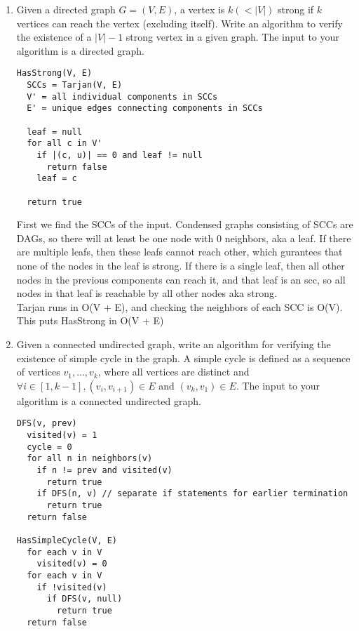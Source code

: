 \documentclass[11pt]{article}
\begin{document}
\begin{enumerate}
\newpage

\item 
Given a directed graph $G = (V, E)$, a vertex is $k ( < |V|)$ strong
if $k$ vertices can reach the vertex (excluding itself). Write an
algorithm to verify the existence of a $|V|-1$ strong vertex in a
given graph. The input to your algorithm is a directed graph.

\begin{verbatim}
HasStrong(V, E)
  SCCs = Tarjan(V, E)
  V' = all individual components in SCCs
  E' = unique edges connecting components in SCCs

  leaf = null
  for all c in V'
    if |(c, u)| == 0 and leaf != null
      return false
    leaf = c
  
  return true
\end{verbatim}

First we find the SCCs of the input.
Condensed graphs consisting of SCCs are DAGs, so there will at least be one node with 0 neighbors, aka a leaf.
If there are multiple leafs, then these leafs cannot reach other, which gurantees that none of the nodes in the leaf is strong.
If there is a single leaf, then all other nodes in the previous components can reach it, and that leaf is an scc, so all nodes in that leaf is reachable by all other nodes aka strong. \\
Tarjan runs in O(V + E), and checking the neighbors of each SCC is O(V). This puts HasStrong in O(V + E)

\newpage

\item 
Given a connected undirected graph, write an algorithm for verifying
the existence of simple cycle in the graph. A simple cycle is defined
as a sequence of vertices $v_1, \ldots, v_{k}$, where all
vertices are distinct and $\forall i\in [1, k-1], (v_i, v_{i+1}) \in
E$ and $(v_{k}, v_1) \in E$. The input to your algorithm is a connected
undirected graph.

\begin{verbatim}
DFS(v, prev)
  visited(v) = 1
  cycle = 0
  for all n in neighbors(v)
    if n != prev and visited(v)
      return true
    if DFS(n, v) // separate if statements for earlier termination
      return true
  return false

HasSimpleCycle(V, E)
  for each v in V
    visited(v) = 0
  for each v in V
    if !visited(v)
      if DFS(v, null)
        return true
  return false

\end{verbatim}


\end{enumerate}
\end{document}

